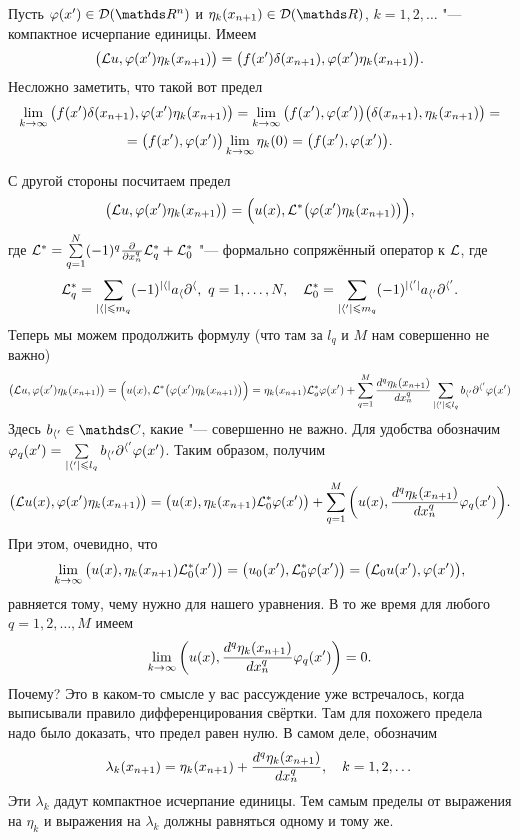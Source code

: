 \begin{Proof}
	Пусть $\phi(x')\in\D(\R^n)$ и $\eta_k(x_{n+1})\in\D(\R)$, $k=1,2,\dots$ "--- компактное исчерпание единицы. Имеем
	\[
		\big(\mathcal L u,\varphi(x')\eta_k(x_{n+1})\big) = \big(f(x')\delta(x_{n+1}),\varphi(x')\eta_k(x_{n+1})\big). 
	\]
	Несложно заметить, что такой вот предел
	\begin{multline*}
		\lim\limits_{k\rightarrow\infty}\big(f(x')\delta(x_{n+1}),\varphi(x')\eta_k(x_{n+1})\big) =
		\lim\limits_{k\rightarrow\infty}\big(f(x'),\varphi(x')\big)\big(\delta(x_{n+1}),\eta_k(x_{n+1})\big)=\\
		=\big(f(x'),\varphi(x')\big)\lim\limits_{k\rightarrow\infty}\eta_k(0)=\big(f(x'),\varphi(x')\big).
	\end{multline*}
	
	С другой стороны посчитаем предел
	\[
		 \big(\mathcal L u,\varphi(x')\eta_k(x_{n+1})\big) = \Big(u(x),\mathcal L^*\big(\varphi(x')\eta_k(x_{n+1})\big)\Big), 
	\]
	где $	 \mathcal L^* = \sum\limits_{q = 1}^{N}(-1)^q\frac{\partial  }{\partial x_n^q}\mathcal L_q^* + \mathcal L_0^*$ "--- формально сопряжённый оператор к $\mathcal L$, где
	\[
		\mathcal L_q^* = \sum\limits_{|\langle|\leqslant m_q}(-1)^{|\langle|}a_\langle\partial^\langle,\ q = 1,\dots, N,\quad
		\mathcal L_0^* = \sum\limits_{|\langle'|\leqslant m_q}(-1)^{|\langle'|}a_{\langle'}\partial^{\langle'}.
	\]
	Теперь мы можем продолжить формулу (что там за $l_q$ и $M$ нам совершенно не важно)
	\[
		 \big(\mathcal L u,\varphi(x')\eta_k(x_{n+1})\big) = \Big(u(x),\mathcal L^*\big(\varphi(x')\eta_k(x_{n+1})\big)\Big) =
		 \eta_k(x_{n+1})\mathcal L^*_o\varphi(x') + \sum\limits_{q = 1}^{M}\frac{d^q\eta_k(x_{n+1})}{dx_n^q} \sum\limits_{|\langle'|\leqslant l_q} b_{\langle'}\partial^{\langle'}\varphi(x')
	 \]
	 Здесь $b_{\a'}\in\C$, какие "--- совершенно не важно. Для удобства обозначим $\varphi_q(x') = \sum\limits_{|\langle'|\leqslant l_q} b_{\langle'}\partial^{\langle'}\varphi(x')$. Таким образом, получим
	 \[
		 \big(\mathcal L u(x),\varphi(x')\eta_k(x_{n+1})\big) = \big( u(x),\eta_k(x_{n+1})\mathcal L_0^*\varphi(x')\big) +
		 \sum\limits_{q = 1}^{M}\bigg( u(x),\frac{d^q\eta_k(x_{n+1})}{dx_n^q}\varphi_q(x')\bigg).
	\]
	При этом, очевидно, что 
	\[
		\lim\limits_{k\rightarrow\infty} \big(u(x),\eta_k(x_{n+1})\mathcal L_0^*(x')\big) = \big(u_0(x'),\mathcal L_0^*\varphi(x')\big) = \big(\mathcal L_0 u(x'),\varphi(x')\big),
	\]
	равняется тому, чему нужно для нашего уравнения. В то же время для любого $q = 1,2,\dots,M$ имеем
	\[
		\lim\limits_{k\rightarrow\infty}\bigg( u(x),\frac{d^q\eta_k(x_{n+1})}{dx_n^q}\varphi_q(x')\bigg) = 0.
	\]
	Почему? Это в каком-то смысле у вас рассуждение уже встречалось, когда выписывали правило дифференцирования свёртки. Там для похожего предела надо было доказать, что предел равен нулю. В самом деле, обозначим 
	\[
		\lambda_k(x_{n+1}) = \eta_k(x_{n+1}) + \frac{d^q\eta_k(x_{n+1})}{dx_n^q}, \quad k=1,2,\dots
	\]
	Эти $\lambda_k$ дадут компактное исчерпание единицы. Тем самым пределы от выражения на $\eta_k$ и выражения на $\lambda_k$ должны равняться одному и тому же.

\end{Proof}
